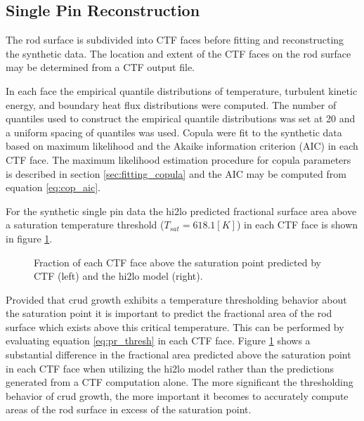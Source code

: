 \subsection{Single Pin Reconstruction}

The rod surface is subdivided into CTF faces before fitting and reconstructing the synthetic data.  The location and extent of the CTF faces on the rod surface may be determined from a CTF output file.  

In each face the empirical quantile distributions of temperature, turbulent kinetic energy, and boundary heat flux distributions were computed.  The number of quantiles used to construct the empirical quantile distributions was set at 20 and a uniform spacing of quantiles was used.  Copula were fit to the synthetic data based on maximum likelihood and the Akaike information criterion (AIC) in each CTF face.  The maximum likelihood estimation procedure for copula parameters is described in section \ref{sec:fitting_copula} and the AIC may be computed from equation \ref{eq:cop_aic}.

For the synthetic single pin data the hi2lo predicted fractional surface area above a saturation temperature threshold ($T_{sat}=618.1[K]$) in each CTF face is shown in figure \ref{fig:frac_a}.

\begin{figure}[H]%
    \centering
    \qquad
    \caption[]{Fraction of each CTF face above the saturation point predicted by CTF (left) and the hi2lo model (right).}%
    \label{fig:frac_a}%
\end{figure}

Provided that crud growth exhibits a temperature thresholding behavior about the saturation point it is important to predict the fractional area of the rod surface which exists above this critical temperature.  This can be performed by evaluating equation \ref{eq:pr_thresh} in each CTF face. Figure \ref{fig:frac_a} shows a substantial difference in the fractional area predicted above the saturation point in each CTF face when utilizing the hi2lo model rather than the predictions generated from a CTF computation alone.  The more significant the thresholding behavior of crud growth, the more important it becomes to accurately compute areas of the rod surface in excess of the saturation point.

